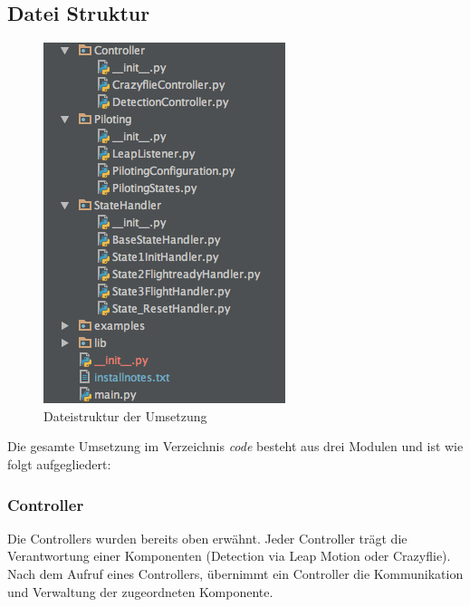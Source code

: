 \subsection{Datei Struktur}
\begin{figure}
	\includegraphics[width=1.0\linewidth]{figures/poc/filestructure.png}
	\caption[Dateistruktur]{Dateistruktur der Umsetzung}
\end{figure}
Die gesamte Umsetzung im Verzeichnis \textit{code} besteht aus drei Modulen und ist wie folgt aufgegliedert:

\subsubsection{Controller}
Die Controllers wurden bereits oben erwähnt. Jeder Controller trägt die Verantwortung einer Komponenten (Detection via Leap Motion oder Crazyflie).
Nach dem Aufruf eines Controllers, übernimmt ein Controller die Kommunikation und Verwaltung der zugeordneten Komponente.

